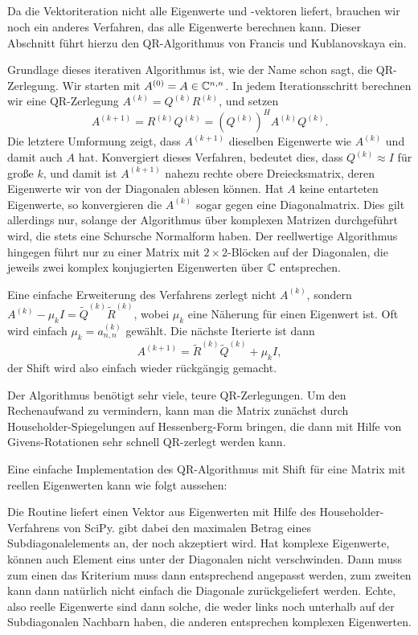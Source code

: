\subsection{}

Da die Vektoriteration nicht alle Eigenwerte und -vektoren liefert,
brauchen wir noch ein anderes Verfahren, das alle Eigenwerte berechnen
kann. Dieser Abschnitt führt hierzu den QR-Algorithmus von Francis und
Kublanovskaya ein.

Grundlage dieses iterativen Algorithmus ist, wie der Name schon sagt,
die QR-Zerlegung. Wir starten mit $A^{(0)} = A\in\mathbb{C}^{n,n}$. In jedem
Iterationsschritt berechnen wir eine QR-Zerlegung
$A^{(k)}=Q^{(k)}R^{(k)}$, und setzen
\begin{equation}
  A^{(k+1)} = R^{(k)}Q^{(k)} = \left(Q^{(k)}\right)^HA^{(k)}Q^{(k)}.
\end{equation}
Die letztere Umformung zeigt, dass $A^{(k+1)}$ dieselben Eigenwerte wie
$A^{(k)}$ und damit auch $A$ hat. Konvergiert dieses Verfahren,
bedeutet dies, dass $Q^{(k)}\approx I$ für große $k$, und damit ist
$A^{(k+1)}$ nahezu rechte obere Dreiecksmatrix, deren Eigenwerte wir
von der Diagonalen ablesen können. Hat $A$ keine entarteten
Eigenwerte, so konvergieren die $A^{(k)}$ sogar gegen eine
Diagonalmatrix. Dies gilt allerdings nur, solange der Algorithmus über
komplexen Matrizen durchgeführt wird, die stets eine Schursche
Normalform haben. Der reellwertige Algorithmus hingegen führt nur zu
einer Matrix mit $2\times 2$-Blöcken auf der Diagonalen, die jeweils
zwei komplex konjugierten Eigenwerten über $\mathbb{C}$ entsprechen.

Eine einfache Erweiterung des Verfahrens zerlegt nicht $A^{(k)}$,
sondern $A^{(k)} - \mu_kI = \tilde{Q}^{(k)}\tilde{R}^{(k)}$, wobei $\mu_k$ eine
Näherung für einen Eigenwert ist. Oft wird einfach $\mu_k = a^{(k)}_{n,n}$
gewählt. Die nächste Iterierte ist dann
\begin{equation}
  A^{(k+1)} = \tilde{R}^{(k)}\tilde{Q}^{(k)} + \mu_kI,
\end{equation}
der Shift wird also einfach wieder rückgängig gemacht.

Der Algorithmus benötigt sehr viele, teure QR-Zerlegungen. Um den
Rechenaufwand zu vermindern, kann man die Matrix zunächst durch
Householder-Spiegelungen auf Hessenberg-Form bringen, die dann mit
Hilfe von Givens-Rotationen sehr schnell QR-zerlegt werden kann.

Eine einfache Implementation des QR-Algorithmus mit Shift für eine
Matrix mit reellen Eigenwerten kann wie folgt aussehen:

Die Routine liefert einen Vektor aus Eigenwerten mit Hilfe des
Householder-Verfahrens von SciPy.  gibt dabei den
maximalen Betrag eines Subdiagonalelements an, der noch akzeptiert
wird.  Hat  komplexe Eigenwerte, können auch Element eins
unter der Diagonalen nicht verschwinden. Dann muss zum einen
das Kriterium muss dann entsprechend angepasst werden, zum zweiten
kann dann natürlich nicht einfach die Diagonale zurückgeliefert
werden. Echte, also reelle Eigenwerte sind dann solche, die weder
links noch unterhalb auf der Subdiagonalen Nachbarn haben, die anderen
entsprechen komplexen Eigenwerten.

